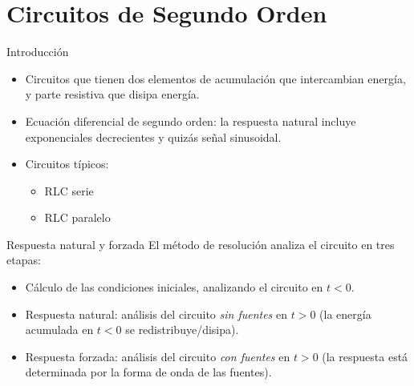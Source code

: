 \documentclass[aspectratio=169, usenames,svgnames,dvipsnames]{beamer}
\begin{document}
\section{Circuitos de Segundo Orden}
\label{sec:orgff63a32}
\begin{frame}[label={sec:org9009bdc}]{Introducción}
\begin{itemize}
\item Circuitos que tienen \alert{dos elementos de acumulación} que intercambian energía, y parte resistiva que disipa energía.
\vfill
\item \alert{Ecuación diferencial de segundo orden}: la respuesta natural incluye exponenciales decrecientes y quizás señal sinusoidal.
\vfill
\item Circuitos típicos:
\begin{itemize}
\item RLC serie
\item RLC paralelo
\end{itemize}
\end{itemize}
\end{frame}
\begin{frame}[label={sec:orgf8a0ca0}]{Respuesta natural y forzada}
El método de resolución analiza el circuito en tres etapas:
  \vfill
\begin{itemize}
\item Cálculo de las \alert{condiciones iniciales}, analizando el circuito en \(t < 0\).
\end{itemize}
\vfill   
\begin{itemize}
\item \alert{Respuesta natural}: análisis del circuito \emph{sin fuentes} en \(t > 0\) (la energía acumulada en \(t < 0\) se redistribuye/disipa).
\end{itemize}
\vfill   
\begin{itemize}
\item \alert{Respuesta forzada}: análisis del circuito \emph{con fuentes} en \(t > 0\) (la respuesta está determinada por la forma de onda de las fuentes).
\end{itemize}
\end{frame}
\end{document}
